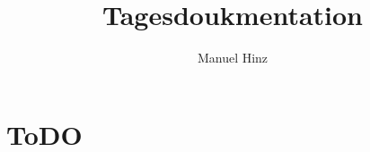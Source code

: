 \documentclass{article}
\author{Manuel Hinz}
\title{Tagesdoukmentation}
\begin{document}
\maketitle

\section{ToDO}
\end{document}
